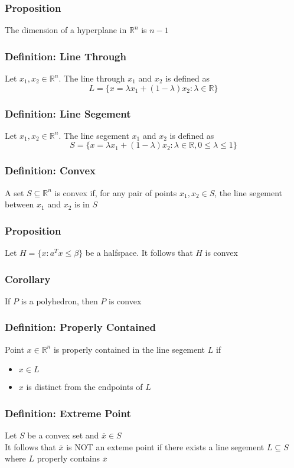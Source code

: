 \documentclass[11pt]{article}
\newcommand{\R}{{\mathbb{R}}}
\begin{document}
\subsubsection{Proposition}
The dimension of a hyperplane in $\R^n$ is $n-1$
\subsubsection{Definition: Line Through}
Let $x_1,x_2\in\R^n$. The line through $x_1$ and $x_2$ is defined as \[L=\{x=\lambda x_1 + (1-\lambda)x_2:\lambda\in\R\}\]
\subsubsection{Definition: Line Segement}
Let $x_1,x_2\in\R^n$. The line segement $x_1$ and $x_2$ is defined as \[S=\{x=\lambda x_1 + (1-\lambda)x_2:\lambda\in\R,0\leq\lambda\leq1\}\]
\subsubsection{Definition: Convex}
A set $S\subseteq\R^n$ is convex if, for any pair of points $x_1, x_2\in S$, the line segement between $x_1$ and $x_2$ is in $S$
\subsubsection{Proposition}
Let $H=\{x:a^Tx\leq\beta\}$ be a halfspace. It follows that $H$ is convex 
\subsubsection{Corollary}
If $P$ is a polyhedron, then $P$ is convex 
\subsubsection{Definition: Properly Contained}
Point $x\in\R^n$ is properly contained in the line segement $L$ if 
\begin{itemize}
  \item $x\in L$
  \item $x$ is distinct from the endpoints of $L$
\end{itemize}
\subsubsection{Definition: Extreme Point}
Let $S$ be a convex set and $\overline{x}\in S$ \\
It follows that $\overline{x}$ is NOT an exteme point if there exists a line segement $L\subseteq S$ where $L$ properly contains $\overline{x}$
\end{document}
